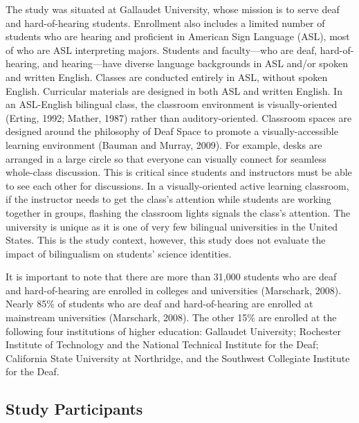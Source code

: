 \documentclass[11.5pt]{sig-alternate} %
\begin{document}
\begin{large}
The study was situated at Gallaudet University, whose mission is to serve deaf and hard-of-hearing students. Enrollment also includes a limited number of students who are hearing and proficient in American Sign Language (ASL), most of who are ASL interpreting majors. Students and faculty—who are deaf, hard-of-hearing, and hearing—have diverse language backgrounds in ASL and/or spoken and written English. Classes are conducted entirely in ASL, without spoken English. Curricular materials are designed in both ASL and written English. In an ASL-English bilingual class, the classroom environment is visually-oriented (Erting, 1992; Mather, 1987) rather than auditory-oriented. Classroom spaces are designed around the philosophy of Deaf Space to promote a visually-accessible learning environment (Bauman and Murray, 2009). For example, desks are arranged in a large circle so that everyone can visually connect for seamless whole-class discussion. This is critical since students and instructors must be able to see each other for discussions. In a visually-oriented active learning classroom, if the instructor needs to get the class’s attention while students are working together in groups, flashing the classroom lights signals the class’s attention. The university is unique as it is one of very few bilingual universities in the United States. This is the study context, however, this study does not evaluate the impact of bilingualism on students’ science identities.

It is important to note that there are more than 31,000 students who are deaf and hard-of-hearing are enrolled in colleges and universities (Marschark, 2008). Nearly 85\% of students who are deaf and hard-of-hearing are enrolled at mainstream universities (Marschark, 2008). The other 15\% are enrolled at the following four institutions of higher education: Gallaudet University; Rochester Institute of Technology and the National Technical Institute for the Deaf; California State University at Northridge, and the Southwest Collegiate Institute for the Deaf. 

\subsection*{Study Participants}


\end{large}
\end{document}
